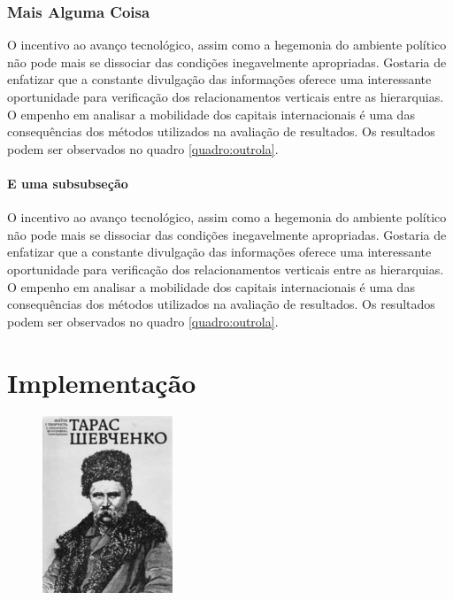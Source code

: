 \documentclass[font=plain,chapter=TITLE,section=Title,espaco=duplo,tocpage=plain,appendix=Name,floatnumber=continuous]{abnt}
\begin{document}
\subsection{Mais Alguma Coisa}

O incentivo ao avanço tecnológico, assim como a hegemonia do ambiente político
não pode mais se dissociar das condições inegavelmente apropriadas. Gostaria de
enfatizar que a constante divulgação das informações oferece uma interessante
oportunidade para verificação dos relacionamentos verticais entre as
hierarquias. O empenho em analisar a mobilidade dos capitais internacionais é
uma das consequências dos métodos utilizados na avaliação de resultados. Os
resultados podem ser observados no quadro \ref{quadro:outrola}.

\subsubsection{E uma subsubseção}

O incentivo ao avanço tecnológico, assim como a hegemonia do ambiente político
não pode mais se dissociar das condições inegavelmente apropriadas. Gostaria de
enfatizar que a constante divulgação das informações oferece uma interessante
oportunidade para verificação dos relacionamentos verticais entre as
hierarquias. O empenho em analisar a mobilidade dos capitais internacionais é
uma das consequências dos métodos utilizados na avaliação de resultados. Os
resultados podem ser observados no quadro \ref{quadro:outrola}.

\chapter{Implementação}

\begin{figure}[h!]
  \centering
  \includegraphics{img/taras.png}
  \label{fig:shevchenko}
\end{figure}
\end{document}
